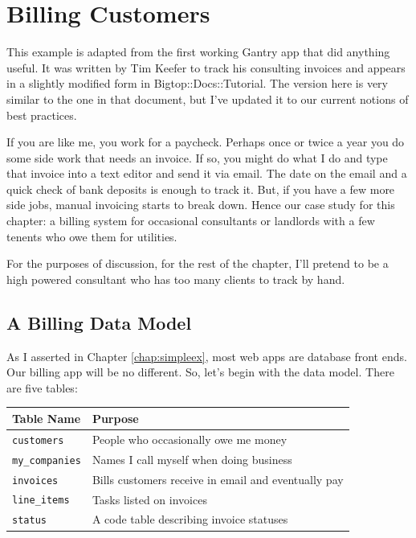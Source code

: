 \chapter{Billing Customers}
\label{chap:billingapp}

This example is adapted from the first working Gantry app that did anything
useful.  It was written by Tim Keefer to track his consulting invoices
and appears in a slightly modified form in Bigtop::Docs::Tutorial.  The
version here is very similar to the one in that document, but I've
updated it to our current notions of best practices.

If you are like me, you work for a paycheck.  Perhaps once or twice a year
you do some side work that needs an invoice.  If so, you might do what I
do and type that invoice into a text editor and send it via email.  The
date on the email and a quick check of bank deposits is enough to track it.
But, if you have a few more side jobs, manual invoicing starts to break down.
Hence our case study for this chapter: a billing system for occasional
consultants or landlords with a few tenents who owe them for utilities.

For the purposes of discussion, for the rest of the chapter, I'll pretend
to be a high powered consultant who has too many clients to track by hand.

\section{A Billing Data Model}

As I asserted in Chapter \ref{chap:simpleex}, most web apps are database
front ends.  Our billing app will be no different.  So, let's begin
with the data model.  There are five tables:

\begin{tabular}{l|l}
Table Name          & Purpose                                             \\
\hline
\verb+customers+    & People who occasionally owe me money                \\
\verb+my_companies+ & Names I call myself when doing business             \\
\verb+invoices+     & Bills customers receive in email and eventually pay \\
\verb+line_items+   & Tasks listed on invoices                            \\
\verb+status+       & A code table describing invoice statuses
\end{tabular}

